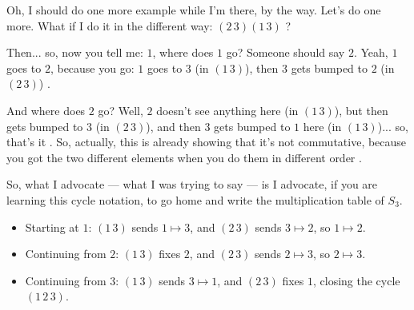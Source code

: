 \begin{hidden}
\end{hidden}

\begin{speech}[01:14:45 - 01:15:45]
Oh, I should do one more example while I'm there, by the way. Let's do one more. What if I do it in the different way: $(2\,3)(1\,3)$ ?

Then... so, now you tell me: $1$, where does $1$ go? Someone should say $2$. Yeah, $1$ goes to $2$, because you go: $1$ goes to $3$ (in $(1\,3)$), then $3$ gets bumped to $2$ (in $(2\,3)$) .

And where does $2$ go? Well, $2$ doesn't see anything here (in $(1\,3)$), but then gets bumped to $3$ (in $(2\,3)$), and then $3$ gets bumped to $1$ here (in $(1\,3)$)... so, that's it . So, actually, this is already showing that it's not commutative, because you got the two different elements when you do them in different order .

So, what I advocate --- what I was trying to say --- is I advocate, if you are learning this cycle notation, to go home and write the multiplication table of $S_3$.
\end{speech}

\begin{content}

\begin{steps}
\begin{itemize}
    \item Starting at $1$: $(1\,3)$ sends $1 \mapsto 3$, and $(2\,3)$ sends $3 \mapsto 2$, so $1 \mapsto 2$.
    \item Continuing from $2$: $(1\,3)$ fixes $2$, and $(2\,3)$ sends $2 \mapsto 3$, so $2 \mapsto 3$.
    \item Continuing from $3$: $(1\,3)$ sends $3 \mapsto 1$, and $(2\,3)$ fixes $1$, closing the cycle $(1\,2\,3)$.
\end{itemize}
\end{steps}
\end{content}

